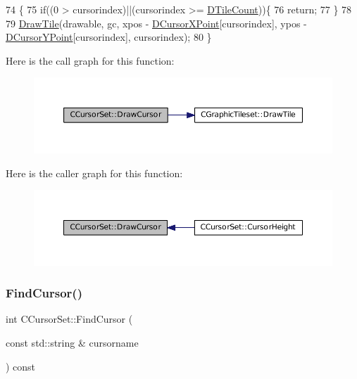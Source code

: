 \begin{DoxyCode}
74                                                                                                   \{
75     \textcolor{keywordflow}{if}((0 > cursorindex)||(cursorindex >= \hyperlink{classCGraphicTileset_a39d942b370e47f441bf97385eb1037c8}{DTileCount}))\{
76         \textcolor{keywordflow}{return};
77     \}
78     
79     \hyperlink{classCGraphicTileset_afefd501a74e95295b7cd2dc868dcbbcb}{DrawTile}(drawable, gc, xpos - \hyperlink{classCCursorSet_af36d1812e93362f15553c63876f2045b}{DCursorXPoint}[cursorindex], ypos - 
      \hyperlink{classCCursorSet_a581192f0e4414acce8b1da7f24ea1b98}{DCursorYPoint}[cursorindex], cursorindex);
80 \}
\end{DoxyCode}
Here is the call graph for this function\+:
\nopagebreak
\begin{figure}[H]
\begin{center}
\leavevmode
\includegraphics[width=350pt]{classCCursorSet_ab28cc2871e723b2509a5036eac1086ba_cgraph}
\end{center}
\end{figure}
Here is the caller graph for this function\+:
\nopagebreak
\begin{figure}[H]
\begin{center}
\leavevmode
\includegraphics[width=350pt]{classCCursorSet_ab28cc2871e723b2509a5036eac1086ba_icgraph}
\end{center}
\end{figure}
\hypertarget{classCCursorSet_a6a7ee8b41e6de490a7817b3f3ce5fb9f}{}\label{classCCursorSet_a6a7ee8b41e6de490a7817b3f3ce5fb9f} 
\subsubsection{\texorpdfstring{Find\+Cursor()}{FindCursor()}}
{\footnotesize\ttfamily int C\+Cursor\+Set\+::\+Find\+Cursor (\begin{DoxyParamCaption}\item[{const std\+::string \&}]{cursorname }\end{DoxyParamCaption}) const}



